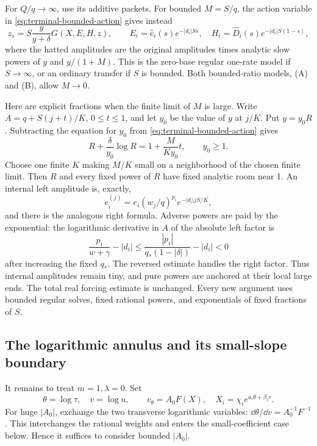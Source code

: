 For \(Q/q\to\infty\), use its additive packets.  For bounded
\(M=S/q\), the action variable in \eqref{eq:terminal-bounded-action}
gives instead
\begin{equation}\label{eq:terminal-bounded-b}
 z_s=S\frac{y}{y+\delta}G(X,E,H,z),
 \qquad E_i=\widehat e_i(s)e^{-|d_i|Ss},\quad
 H_i=\widehat D_i(s)e^{-|d_i|S(1-s)},
\end{equation}
where the hatted amplitudes are the original amplitudes times analytic
slow powers of \(y\) and \(y/(1+M)\).  This is the zero-base regular
one-rate model if \(S\to\infty\), or an ordinary transfer if \(S\)
is bounded.  Both bounded-ratio models, (A) and (B), allow \(M\to0\).

Here are explicit fractions when the finite limit of \(M\) is large.
Write \(A=q+S(j+t)/K\), \(0\le t\le1\), and let \(y_0\) be the value
of \(y\) at \(j/K\).  Put \(y=y_0R\).  Subtracting the equation for
\(y_0\) from \eqref{eq:terminal-bounded-action} gives
\begin{equation}\label{eq:terminal-local-ratio}
 R+\frac{\delta}{y_0}\log R
 =1+\frac{M}{Ky_0}t,\qquad y_0\ge1.
\end{equation}
Choose one finite \(K\) making \(M/K\) small on a neighborhood of the
chosen finite limit.  Then \(R\) and every fixed power of \(R\) have
fixed analytic room near 1.  An internal left amplitude is, exactly,
\[
 e_i^{(j)}=e_i(w_j/q)^{p_i}e^{-|d_i|jS/K},
\]
and there is the analogous right formula.  Adverse powers are paid by the
exponential: the logarithmic derivative in \(A\) of the absolute left
factor is
\[
 \frac{p_i}{w+\gamma}-|d_i|
 \le\frac{|p_i|}{q_*(1-|\delta|)}-|d_i|<0
\]
after increasing the fixed \(q_*\).  The reversed estimate handles the
right factor.  Thus internal amplitudes remain tiny, and pure powers are
anchored at their local large ends.  The total real forcing estimate is
unchanged.  Every new argument uses bounded regular solves, fixed rational
powers, and exponentials of fixed fractions of \(S\).

\subsection{The logarithmic annulus and its small-slope boundary}

It remains to treat \(m=1,\lambda=0\).  Set
\begin{equation}\label{eq:terminal-log-annulus}
 \theta=\log\tau,\quad v=\log u,\qquad
 v_\theta=A_0F(X),\quad X_i=\chi_i e^{a_i\theta+\beta_i v}.
\end{equation}
For huge \(|A_0|\), exchange the two transverse logarithmic variables:
\(\dd\theta/\dd v=A_0^{-1}F^{-1}\).  This interchanges the rational
weights and enters the small-coefficient case below.  Hence it suffices to
consider bounded \(|A_0|\).

